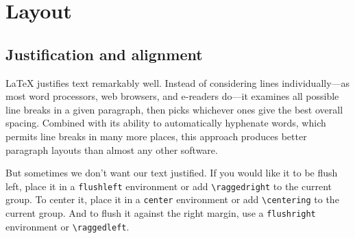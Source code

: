 \chapter{Layout}

\section{Justification and alignment}

\LaTeX{} justifies text remarkably well.
Instead of considering lines individually---as most word processors,
web browsers, and e-readers do---it examines all possible line breaks
in a given paragraph,
then picks whichever ones give the best overall
spacing.\punckern{}
Combined with its ability to automatically hyphenate words,
which permits line breaks in many more places,\punckern{}
this approach produces better paragraph layouts than almost any other software.

But sometimes we don't want our text justified.
If you would like it to be flush left,
place it in a \texttt{flushleft} environment
or add \verb|\raggedright| to the current group.
To center it, place it in a
\texttt{center} environment or add \verb|\centering| to the current group.
And to flush it against the right margin,
use a \texttt{flushright} environment or \verb|\raggedleft|.


